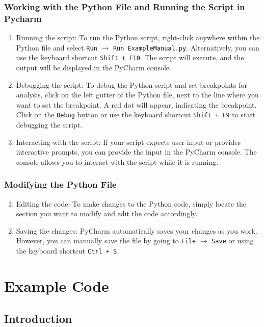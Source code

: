 \subsubsection{Working with the Python File and Running the Script in Pycharm}

\begin{enumerate}
	\item Running the script: To run the Python script, right-click anywhere within the Python file and select \texttt{Run} $\rightarrow$ \texttt{Run ExampleManual.py}. Alternatively, you can use the keyboard shortcut \texttt{Shift + F10}. The script will execute, and the output will be displayed in the PyCharm console.
	\item Debugging the script: To debug the Python script and set breakpoints for analysis, click on the left gutter of the Python file, next to the line where you want to set the breakpoint. A red dot will appear, indicating the breakpoint. Click on the \texttt{Debug} button or use the keyboard shortcut \texttt{Shift + F9} to start debugging the script.
	\item Interacting with the script: If your script expects user input or provides interactive prompts, you can provide the input in the PyCharm console. The console allows you to interact with the script while it is running.
\end{enumerate}


\subsubsection{Modifying the Python File}

\begin{enumerate}
	\item Editing the code: To make changes to the Python code, simply locate the section you want to modify and edit the code accordingly.
	\item Saving the changes: PyCharm automatically saves your changes as you work. However, you can manually save the file by going to \texttt{File} $\rightarrow$ \texttt{Save} or using the keyboard shortcut \texttt{Ctrl + S}.
\end{enumerate}


\section{Example Code}

\subsection{Introduction}

